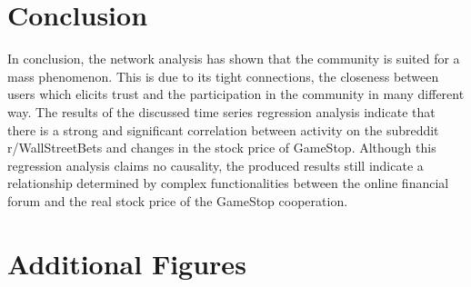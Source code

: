 \documentclass[noacm,sigconf,authorversion]{acmart}
\begin{document}



\section{Conclusion}

In conclusion, the network analysis has shown that the community is suited for a mass phenomenon. This is due to its tight connections, the closeness between users which elicits trust and the participation in the community in many different way. The results of the discussed time series regression analysis indicate that there is a strong and significant correlation between activity on the subreddit r/WallStreetBets and changes in the stock price of GameStop. Although this regression analysis claims no causality, the produced results still indicate a relationship determined by complex functionalities between the online financial forum and the real stock price of the GameStop cooperation.


\newpage





\appendix

\section*{Additional Figures}
\end{document}
